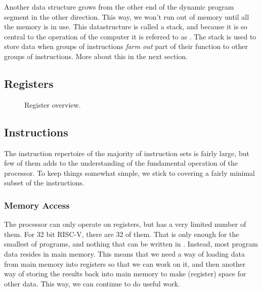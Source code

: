 Another data structure grows from the other end of the dynamic program segment in the other direction. This way, we won't run out of memory until all the memory is in use. This datastructure is called a stack, and because it is so central to the operation of the computer it is referred to as . The stack is used to store data when groups of instructions \textsl{farm out} part of their function to other groups of instructions. More about this in the next section.

\subsection{Registers}


\begin{figure}[tbp]
  
  \caption{Register overview.}
  \label{fig:machine:regs}
\end{figure}


\subsection{Instructions}

The instruction repertoire of the majority of instruction sets is fairly large, but few of them adds to the understanding of the fundamental operation of the processor. To keep things somewhat simple, we stick to covering a fairly minimal subset of the instructions.


\subsubsection{Memory Access}

The processor can only operate on registers, but has a very limited number of them. For 32 bit RISC-V, there are 32 of them. That is only enough for the smallest of programs, and nothing that can be written in \csharp. Instead, most program data resides in main memory. This means that we need a way of loading data from main memory into registers so that we can work on it, and then another way of storing the results back into main memory to make (register) space for other data. This way, we can continue to do useful work.

